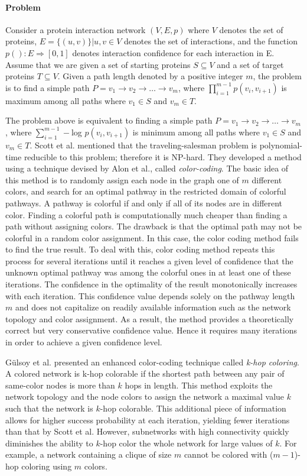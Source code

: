 \documentclass{ws-procs11x85}
\begin{document}
\paragraph{Problem} Consider a protein interaction network $(V, E, p)$ where
$V$ denotes the set of proteins, $E = \{(u, v)\} | u,v \in V$ denotes the set of
interactions, and the function $p(): E \Rightarrow [0, 1]$  denotes interaction
confidence for each interaction in E. Assume that we are given a set of starting
proteins $S \subseteq V$ and a set of target proteins $T \subseteq V$. Given a
path length denoted by a positive integer $m$, the problem is to find a simple
path $P = v_1 \rightarrow v_2 \rightarrow \ldots \rightarrow v_m$, where
$\prod_{i=1}^{m-1} p(v_i, v_{i+1})$ is maximum among all paths where $v_1 \in S$
and $v_m \in T$.

The problem above is equivalent to finding a simple path $P = v_1 \rightarrow
v_2 \rightarrow \ldots \rightarrow v_m$, where $\sum_{i=1}^{m-1} -$log $p(v_i,
v_{i+1})$ is minimum among all paths where $v_1 \in S$ and $v_m \in T$. Scott et
al.\cite{scott} mentioned that the traveling-salesman problem is polynomial-time
reducible to this problem; therefore it is NP-hard. They developed a method
using a technique devised by Alon et al.\cite{alon}, called
\textit{color-coding}. The basic idea of this method is to randomly assign each
node in the graph one of $m$ different colors, and search for an optimal
pathway in the restricted domain of colorful pathways. A pathway is colorful if
and only if all of its nodes are in different color. Finding a colorful path is
computationally much cheaper than finding a path without assigning colors. The
drawback is that the optimal path may not be colorful in a random color
assignment. In this case, the color coding method fails to find the true result.
To deal with this, color coding method repeats this process for several
iterations until it reaches a given level of confidence that the unknown
optimal pathway was among the colorful ones in at least one of these iterations.
The confidence in the optimality of the result monotonically increases with each
iteration. This confidence value depends solely on the pathway length $m$ and
does not capitalize on readily available information such as the network
topology and color assignment. As a result, the method provides a theoretically
correct but very conservative confidence value. Hence it requires many
iterations in order to achieve a given confidence level.

G{\"u}lsoy et al.\cite{gulsoy} presented an enhanced color-coding technique
called \textit{k-hop coloring}. A colored network is
k-hop colorable if the shortest path between any pair of same-color nodes is
more than $k$ hops in length. This method exploits the network topology and
the node colors to assign the network a maximal value $k$ such that the network
is $k$-hop colorable. This additional piece of information allows for higher
success probability at each iteration, yielding fewer iterations than that
by Scott et al. However, subnetworks with high connectivity quickly diminishes
the ability to $k$-hop color the whole network for large values of $k$. For
example, a network containing a clique of size $m$ cannot be colored with
($m-1$)-hop coloring using $m$ colors\cite{gulsoy}.
\end{document}
